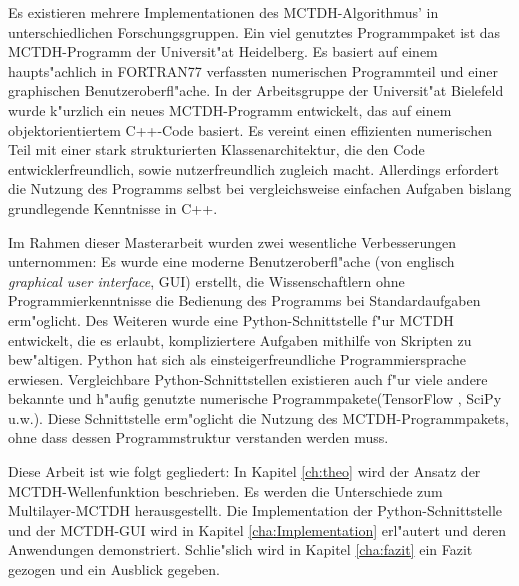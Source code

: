 Es existieren mehrere Implementationen des MCTDH-Algorithmus' in unterschiedli\-chen Forschungsgruppen.
Ein viel genutztes Programmpaket ist das MCTDH-Programm der Universit"at Heidelberg\cite{Heidelberg}. Es
basiert auf einem haupts"achlich in FORTRAN77 verfassten numerischen Programmteil und einer
graphischen Benutzeroberfl"ache. In der Arbeitsgruppe der Universit"at Bielefeld wurde k"urzlich
ein neues MCTDH-Programm entwickelt, das auf einem objektorientiertem C++-Code basiert.
Es vereint einen effizienten numerischen Teil mit einer stark strukturierten Klassenarchitektur,
die den Code entwicklerfreundlich, sowie nutzerfreundlich zugleich macht. Allerdings erfordert
die Nutzung des Programms selbst bei vergleichsweise einfachen Aufgaben bislang
grundlegende Kenntnisse in C++.

Im Rahmen dieser Masterarbeit wurden zwei wesentliche Verbesserungen unternommen: 
Es wurde eine moderne Benutzeroberfl"ache (von englisch \textit{graphical user interface}, GUI) erstellt,
die Wissenschaftlern ohne Programmierkenntnisse die Bedienung des Programms bei Standardaufgaben erm"oglicht.
Des Weiteren wurde eine Python-Schnittstelle f"ur MCTDH entwickelt,
die es erlaubt, kompliziertere Aufgaben mithilfe von Skripten zu bew"altigen.
Python hat sich als einsteigerfreundliche Programmiersprache erwiesen. 
Vergleichbare Python-Schnittstellen existieren auch f"ur viele andere bekannte und h"aufig genutzte 
numerische Programmpakete(TensorFlow \cite{TensorFlow}, SciPy \cite{SciPy} u.w.).
Diese Schnittstelle erm"oglicht die Nutzung des MCTDH-Programmpakets, ohne dass 
dessen Programmstruktur verstanden werden muss.
 
Diese Arbeit ist wie folgt gegliedert: In Kapitel \ref{ch:theo} wird der Ansatz der MCTDH-Wellenfunk\-tion beschrieben. 
Es werden die Unterschiede zum Multilayer-MCTDH herausgestellt. Die Implementation der
Python-Schnittstelle und der MCTDH-GUI wird
in Kapitel \ref{cha:Implementation} erl"autert und deren Anwendungen demonstriert.
Schlie"slich wird in Kapitel \ref{cha:fazit} ein Fazit gezogen und ein Ausblick gegeben.     
